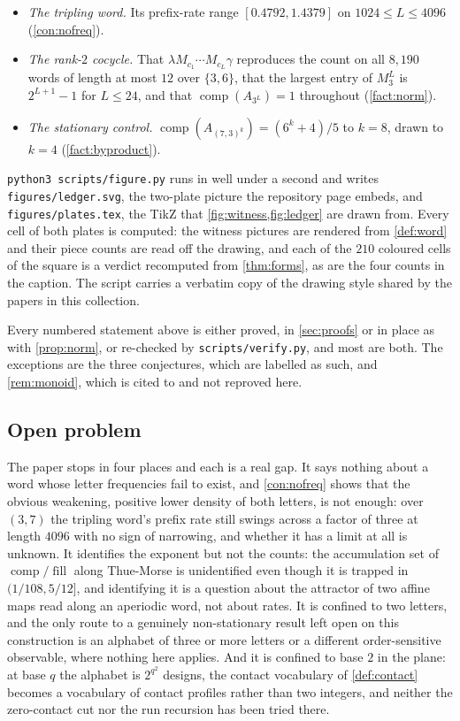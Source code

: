 \documentclass[11pt]{amsart}
\theoremstyle{definition}
\theoremstyle{remark}
\newcommand{\vpy}{\texttt{scripts/\allowbreak verify.py}}
\DeclareMathOperator{\comp}{comp}
\DeclareMathOperator{\fil}{fill}
\begin{document}
\begin{itemize}
\item \emph{The tripling word.} Its prefix-rate range $[0.4792, 1.4379]$ on $1024 \le L \le 4096$ (\cref{con:nofreq}).
\item \emph{The rank-$2$ cocycle.} That $\lambda M_{c_1}\cdots M_{c_L}\gamma$ reproduces the count on all $8{,}190$ words of length at most $12$ over $\{3,6\}$, that the largest entry of $M_3^L$ is $2^{L+1}-1$ for $L \le 24$, and that $\comp(A_{3^L}) = 1$ throughout (\cref{fact:norm}).
\item \emph{The stationary control.} $\comp(A_{(7,3)^k}) = (6^k+4)/5$ to $k = 8$, drawn to $k = 4$ (\cref{fact:byproduct}).
\end{itemize}

\texttt{python3 scripts/figure.py} runs in well under a second and writes \texttt{figures/ledger.svg}, the two-plate picture the repository page embeds, and \texttt{figures/plates.tex}, the TikZ that \cref{fig:witness,fig:ledger} are drawn from. Every cell of both plates is computed: the witness pictures are rendered from \cref{def:word} and their piece counts are read off the drawing, and each of the $210$ coloured cells of the square is a verdict recomputed from \cref{thm:forms}, as are the four counts in the caption. The script carries a verbatim copy of the drawing style shared by the papers in this collection.

Every numbered statement above is either proved, in \cref{sec:proofs} or in place as with \cref{prop:norm}, or re-checked by \vpy{}, and most are both. The exceptions are the three conjectures, which are labelled as such, and \cref{rem:monoid}, which is cited to \cite{voet} and not reproved here.

\subsection*{Open problem}

The paper stops in four places and each is a real gap. It says nothing about a word whose letter frequencies fail to exist, and \cref{con:nofreq} shows that the obvious weakening, positive lower density of both letters, is not enough: over $(3,7)$ the tripling word's prefix rate still swings across a factor of three at length $4096$ with no sign of narrowing, and whether it has a limit at all is unknown. It identifies the exponent but not the counts: the accumulation set of $\comp/\fil$ along Thue-Morse is unidentified even though it is trapped in $(1/108, 5/12]$, and identifying it is a question about the attractor of two affine maps read along an aperiodic word, not about rates. It is confined to two letters, and the only route to a genuinely non-stationary result left open on this construction is an alphabet of three or more letters or a different order-sensitive observable, where nothing here applies. And it is confined to base $2$ in the plane: at base $q$ the alphabet is $2^{q^2}$ designs, the contact vocabulary of \cref{def:contact} becomes a vocabulary of contact profiles rather than two integers, and neither the zero-contact cut nor the run recursion has been tried there.
\end{document}

